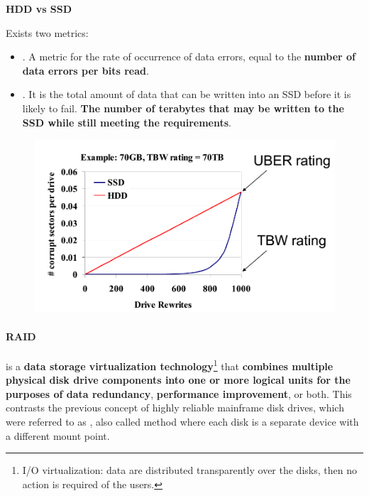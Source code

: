 \begin{flushleft}
    \textcolor{Red2}{\textbf{HDD vs SSD}}
\end{flushleft}
Exists two metrics:
\begin{itemize}
    \item {}. A metric for the rate of occurrence of data errors, equal to the \textbf{number of data errors per bits read}.
    
    \item {}. It is the total amount of data that can be written into an SSD before it is likely to fail. \textbf{The number of terabytes that may be written to the SSD while still meeting the requirements}.
\end{itemize}
\begin{figure}[!htp]
    \centering
    \includegraphics[width=.7\textwidth]{img/hdd-vs-ssd.png}
\end{figure}

\newpage

\paragraph{RAID}\label{paragraph: RAID}

 is a \textbf{data storage virtualization technology}\footnote{I/O virtualization: data are distributed transparently over the disks, then no action is required of the users.} that \textbf{combines multiple physical disk drive components into one or more logical units for the purposes of data redundancy}, \textbf{performance improvement}, or both. This contrasts the previous concept of highly reliable mainframe disk drives, which were referred to as  , also called  method where each disk is a separate device with a different mount point.

